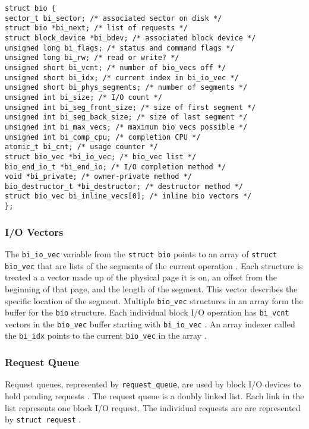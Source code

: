 \begin{lstlisting}
struct bio {
sector_t bi_sector; /* associated sector on disk */
struct bio *bi_next; /* list of requests */
struct block_device *bi_bdev; /* associated block device */
unsigned long bi_flags; /* status and command flags */
unsigned long bi_rw; /* read or write? */
unsigned short bi_vcnt; /* number of bio_vecs off */
unsigned short bi_idx; /* current index in bi_io_vec */
unsigned short bi_phys_segments; /* number of segments */
unsigned int bi_size; /* I/O count */
unsigned int bi_seg_front_size; /* size of first segment */
unsigned int bi_seg_back_size; /* size of last segment */
unsigned int bi_max_vecs; /* maximum bio_vecs possible */
unsigned int bi_comp_cpu; /* completion CPU */
atomic_t bi_cnt; /* usage counter */
struct bio_vec *bi_io_vec; /* bio_vec list */
bio_end_io_t *bi_end_io; /* I/O completion method */
void *bi_private; /* owner-private method */
bio_destructor_t *bi_destructor; /* destructor method */
struct bio_vec bi_inline_vecs[0]; /* inline bio vectors */
};
\end{lstlisting} \cite{LinuxTextbook}


\subsubsection{I/O Vectors}
The \lstinline{bi_io_vec} variable from the \lstinline{struct bio} points to an array of \lstinline{struct bio_vec} that are lists of the segments of the current operation \cite{LinuxTextbook}. Each structure is treated a a vector made up of the physical page it is on, an offset from the beginning of that page, and the length of the segment. This vector describes the specific location of the segment. Multiple \lstinline{bio_vec} structures in an array form the buffer for the \lstinline{bio} structure.
Each individual block I/O operation has \lstinline{bi_vcnt} vectors in the \lstinline{bio_vec} buffer starting with \lstinline{bi_io_vec} \cite{LinuxTextbook}. An array indexer called the \lstinline{bi_idx} points to the current  \lstinline{bio_vec} in the array \cite{LinuxTextbook}. 


\subsubsection{Request Queue}
Request queues, represented by \lstinline{request_queue}, are used by block I/O devices to hold pending requests \cite{LinuxTextbook}. The request queue is a doubly linked list. Each link in the list represents one block I/O request. The individual requests are are represented by \lstinline{struct request} \cite{LinuxTextbook}.


